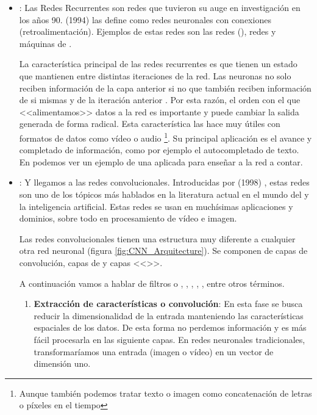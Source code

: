 \begin{itemize}
  \item \textbf{}: Las Redes Recurrentes son redes que tuvieron su auge en investigación en los años 90.  (1994)  las define como redes neuronales con conexiones  (retroalimentación). Ejemplos de estas redes son las redes  (), redes  y máquinas de  .

        La característica principal de las redes recurrentes es que tienen un estado que mantienen entre distintas iteraciones de la red. Las neuronas no solo reciben información de la capa anterior si no que también reciben información de si mismas y de la iteración anterior . Por esta razón, el orden con el que <<alimentamos>> datos a la red es importante y puede cambiar la salida generada de forma radical. Esta característica las hace muy útiles con formatos de datos como vídeo o audio \footnote{Aunque también podemos tratar texto o imagen como concatenación de letras o píxeles en el tiempo}. Su principal aplicación es el avance y completado de información, como por ejemplo el autocompletado de texto.  En  podemos ver un ejemplo de una  aplicada para enseñar a la red a contar.

  \item \textbf{}: Y llegamos a las redes convolucionales. Introducidas por  (1998) , estas redes son uno de los tópicos más hablados en la literatura actual en el mundo del  y la inteligencia artificial. Estas redes se usan en muchísimas aplicaciones y dominios, sobre todo en procesamiento de vídeo e imagen.

        Las redes convolucionales tienen una estructura muy diferente a cualquier otra red neuronal (figura \ref{fig:CNN_Arquitecture}). Se componen de capas de convolución, capas de  y capas <<>>.


        A continuación vamos a hablar de filtros o , , , , , entre otros términos.

        \begin{enumerate}
          \item \textbf{Extracción de características o convolución}: En esta fase se busca reducir la dimensionalidad de la entrada manteniendo las características espaciales de los datos. De esta forma no perdemos información y es más fácil procesarla en las siguiente capas. En redes neuronales tradicionales, transformaríamos una entrada (imagen o vídeo) en un vector de dimensión uno.


\end{enumerate}
\end{itemize}
